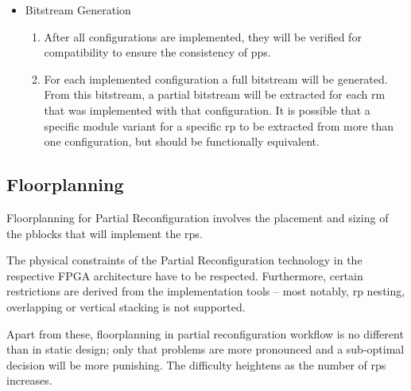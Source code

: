 \begin{itemize}
\begin{enumerate}
		reconfigurable domains. These sites will be locked and all subsequent
		\gls{rm} implementations will be constrained to respect them.
		Therefore the initial configuration must be chosen carefully,
		as a bad choice may render some \gls{rm} variants unroutable for some \glspl{rp}.
		It is recommended to begin with the configuration that contains the
		most difficult to route \gls{rm} variant of each \gls{rp}.
		In order to find a \gls{pp} set that permits the routing of all module variants,
		some trial and error is unavoidable.
	\item	All subsequent configurations import the static part of previous step
		and implement their \gls{rm} variants within its context.
	\end{enumerate}
\item	Bitstream Generation
	\begin{enumerate}
	\item	After all configurations are implemented, they will be verified for compatibility
		to ensure the consistency of \glspl{pp}.
	\item	For each implemented configuration a full bitstream will be generated.
		From this bitstream, a partial bitstream will be extracted for each \gls{rm}
		that was implemented with that configuration.
		It is possible that a specific module variant for a specific \gls{rp}
		to be extracted from more than one configuration,
		but should be functionally equivalent.
	\end{enumerate}
\end{itemize}


\subsection{Floorplanning}

Floorplanning for Partial Reconfiguration involves the placement and sizing of the \glspl{pblock}
that will implement the \glspl{rp}.

The physical constraints of the Partial Reconfiguration technology
in the respective FPGA architecture have to be respected.
Furthermore, certain restrictions are derived from the implementation tools
-- most notably, \gls{rp} nesting, overlapping or vertical stacking is not supported.

Apart from these, floorplanning in partial reconfiguration workflow is no different
than in static design; only that problems are more pronounced and
a sub-optimal decision will be more punishing. The difficulty heightens as
the number of \glspl{rp} increases.

